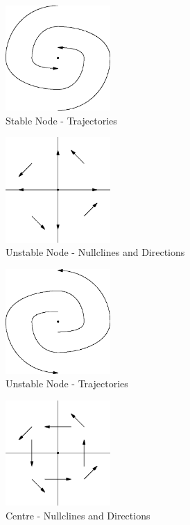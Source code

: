 \documentclass[fleqn,letterpaper]{report}
\begin{document}
\begin{figure}[t]
\centering
\includegraphics[width=4cm]{figure47.eps}
\caption{Stable Node - Trajectories}
\label{figure-stable-node-trajectories}
\end{figure}

\begin{figure}[t]
\centering
\includegraphics[width=4cm]{figure33.eps}
\caption{Unstable Node - Nullclines and Directions}
\label{figure-unstable-node-nullclines}
\end{figure}

\begin{figure}[t]
\centering
\includegraphics[width=4cm]{figure48.eps}
\caption{Unstable Node - Trajectories}
\label{figure-unstable-node-trajectories}
\end{figure}

\begin{figure}[t]
\centering
\includegraphics[width=4cm]{figure29.eps}
\caption{Centre - Nullclines and Directions}
\label{figure-centre-nullclines}
\end{figure}
\end{document}
